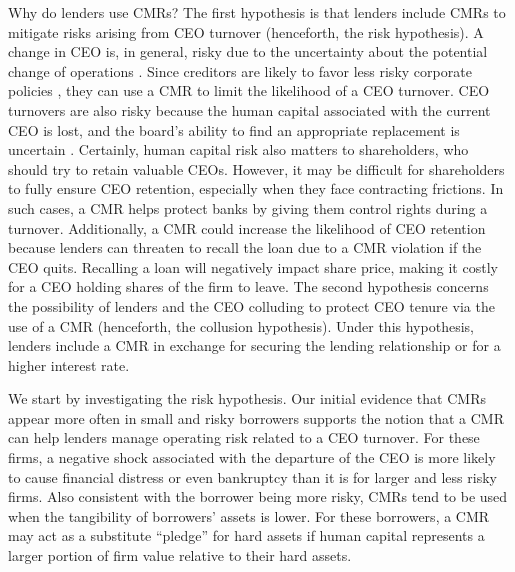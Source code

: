 \documentclass[a4paper,12pt]{article}
\begin{document}
Why do lenders use CMRs?
The first hypothesis is that lenders include CMRs to mitigate risks arising from CEO turnover (henceforth, the risk hypothesis).
A change in CEO is, in general, risky due to the uncertainty about the potential change of operations \citep{Berkovitch_1996, Grinstein_2006}.
Since creditors are likely to favor less risky corporate policies \citep{Jensen_1976}, they can use a CMR to limit the likelihood of a CEO turnover. 
CEO turnovers are also risky because the human capital associated with the current CEO is lost, and the board's ability to find an appropriate replacement is uncertain \citep{Becker_1964}.
Certainly, human capital risk also matters to shareholders, who should try to retain valuable CEOs.
However, it may be difficult for shareholders to fully ensure CEO retention, especially when they face contracting frictions.
In such cases, a CMR helps protect banks by giving them control rights during a turnover.
Additionally, a CMR could increase the likelihood of CEO retention because lenders can threaten to recall the loan due to a CMR violation if the CEO quits.
Recalling a loan will negatively impact share price, making it costly for a CEO holding shares of the firm to leave.
The second hypothesis concerns the possibility of lenders and the CEO colluding to protect CEO tenure via the use of a CMR (henceforth, the collusion hypothesis).
Under this hypothesis, lenders include a CMR in exchange for securing the lending relationship or for a higher interest rate.


We start by investigating the risk hypothesis.
Our initial evidence that CMRs appear more often in small and risky borrowers supports the notion that a CMR can help lenders manage operating risk related to a CEO turnover.
For these firms, a negative shock associated with the departure of the CEO is more likely to cause financial distress or even bankruptcy than it is for larger and less risky firms.
Also consistent with the borrower being more risky, CMRs tend to be used when the tangibility of borrowers' assets is lower.
For these borrowers, a CMR may act as a substitute ``pledge'' for hard assets if human capital represents a larger portion of firm value relative to their hard assets. 
\end{document}
